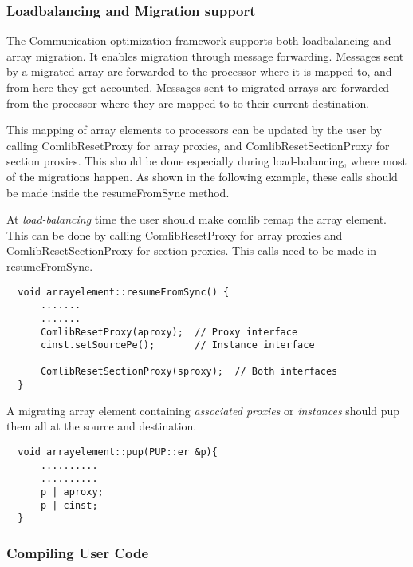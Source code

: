 \subsubsection{Loadbalancing and Migration support}

The Communication optimization framework supports both loadbalancing and array
migration. It enables migration through message forwarding. Messages sent by a
migrated array are forwarded to the processor where it is mapped to, and from
here they get accounted. Messages sent to migrated arrays are forwarded from the
processor where they are mapped to to their current destination.

This mapping of array elements to processors can be updated by the user by
calling {\textrm{ComlibResetProxy}} for array proxies, and
{\textrm{ComlibResetSectionProxy}} for section proxies. This should be done
especially during load-balancing, where most of the migrations happen. As shown
in the following example, these calls should be made inside the
{\textrm{resumeFromSync}} method.

At {\em load-balancing} time the user should make comlib remap the array
element. This can be done by calling ComlibResetProxy for array proxies and
ComlibResetSectionProxy for section proxies. This calls need to be made in
resumeFromSync.

\begin{verbatim}
  void arrayelement::resumeFromSync() {
      .......
      .......
      ComlibResetProxy(aproxy);  // Proxy interface
      cinst.setSourcePe();       // Instance interface

      ComlibResetSectionProxy(sproxy);  // Both interfaces
  }
\end{verbatim}

A migrating array element containing {\em associated proxies} or {\em
instances} should pup them all at the source and destination.

\begin{verbatim}
  void arrayelement::pup(PUP::er &p){
      ..........
      ..........
      p | aproxy;
      p | cinst;
  }
\end{verbatim}

\subsubsection{Compiling User Code}

